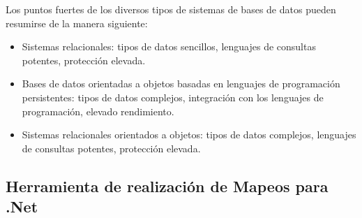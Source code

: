 \documentclass[preprint,12pt]{elsarticle}
\begin{document}
Los puntos fuertes de los diversos tipos de sistemas de bases de datos pueden resumirse de la manera siguiente:
\begin{itemize}
	\item Sistemas relacionales: tipos de datos sencillos, lenguajes de consultas potentes, protección elevada.
	\item Bases de datos orientadas a objetos basadas en lenguajes de programación persistentes: tipos de datos complejos, integración con los lenguajes de programación, elevado rendimiento.
	\item Sistemas relacionales orientados a objetos: tipos de datos complejos, lenguajes de consultas potentes, protección elevada.\cite{SilberschatzKorthSudarshan2006}
\end{itemize}

\subsection{\textbf{Herramienta de realización de Mapeos para .Net}}
\end{document}
